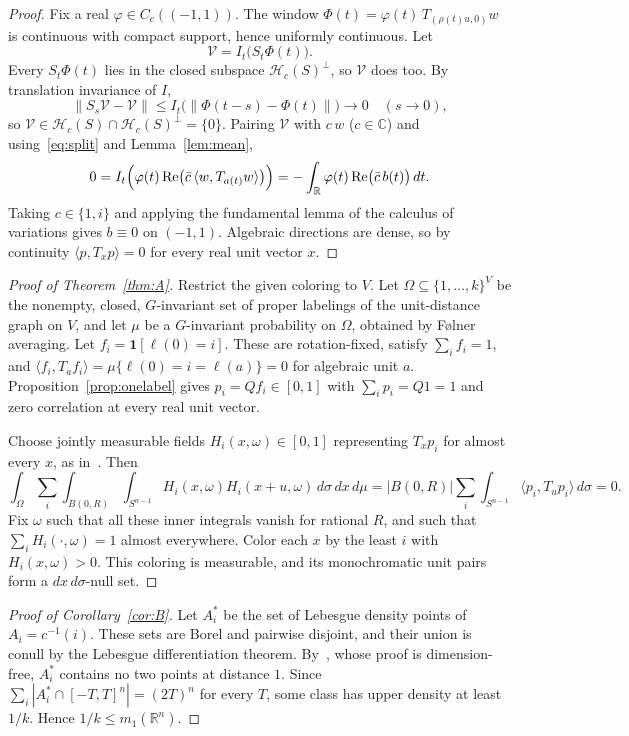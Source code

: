 \documentclass[11pt]{amsart}
\theoremstyle{definition}
\newcommand{\R}{\mathbb{R}}
\newcommand{\C}{\mathbb{C}}
\newcommand{\cH}{\mathcal{H}}
\begin{document}
\begin{proof}
Fix a real $\varphi\in C_c((-1,1))$. The window $\Phi(t)=\varphi(t)\,T_{(\rho(t)u,0)}w$ is continuous with compact support, hence uniformly continuous. Let
\[
\mathcal V=I_t\bigl(S_t\Phi(t)\bigr).
\]
Every $S_t\Phi(t)$ lies in the closed subspace $\cH_c(S)^\perp$, so $\mathcal V$ does too. By translation invariance of $I$,
\[
\|S_s\mathcal V-\mathcal V\|\le I_t\bigl(\|\Phi(t-s)-\Phi(t)\|\bigr)\to0\quad(s\to0),
\]
so $\mathcal V\in\cH_c(S)\cap\cH_c(S)^\perp=\{0\}$. Pairing $\mathcal V$ with $c\,w$ ($c\in\C$) and using~\eqref{eq:split} and Lemma~\ref{lem:mean},
\[
0=I_t\Bigl(\varphi(t)\,\mathrm{Re}\bigl(\bar c\,\langle w,T_{a(t)}w\rangle\bigr)\Bigr)=-\int_\R\varphi(t)\,\mathrm{Re}\bigl(\bar c\,b(t)\bigr)\,dt .
\]
Taking $c\in\{1,i\}$ and applying the fundamental lemma of the calculus of variations gives $b\equiv0$ on $(-1,1)$. Algebraic directions are dense, so by continuity $\langle p,T_xp\rangle=0$ for every real unit vector $x$.
\end{proof}

\begin{proof}[Proof of Theorem~\ref{thm:A}]
Restrict the given coloring to $V$. Let $\Omega\subseteq\{1,\dots,k\}^V$ be the nonempty, closed, $G$-invariant set of proper labelings of the unit-distance graph on $V$, and let $\mu$ be a $G$-invariant probability on $\Omega$, obtained by F\o lner averaging. Let $f_i=\mathbf 1[\ell(0)=i]$. These are rotation-fixed, satisfy $\sum_if_i=1$, and $\langle f_i,T_af_i\rangle=\mu\{\ell(0)=i=\ell(a)\}=0$ for algebraic unit $a$. Proposition~\ref{prop:onelabel} gives $p_i=Qf_i\in[0,1]$ with $\sum_ip_i=Q1=1$ and zero correlation at every real unit vector.

Choose jointly measurable fields $H_i(x,\omega)\in[0,1]$ representing $T_xp_i$ for almost every $x$, as in~\cite[proof of Proposition 4.2]{OAI}. Then
\[
\int_\Omega\sum_i\int_{B(0,R)}\int_{S^{n-1}}H_i(x,\omega)H_i(x+u,\omega)\,d\sigma\,dx\,d\mu=|B(0,R)|\sum_i\int_{S^{n-1}}\langle p_i,T_up_i\rangle\,d\sigma=0 .
\]
Fix $\omega$ such that all these inner integrals vanish for rational $R$, and such that $\sum_iH_i(\cdot,\omega)=1$ almost everywhere. Color each $x$ by the least $i$ with $H_i(x,\omega)>0$. This coloring is measurable, and its monochromatic unit pairs form a $dx\,d\sigma$-null set.
\end{proof}

\begin{proof}[Proof of Corollary~\ref{cor:B}]
Let $A_i^*$ be the set of Lebesgue density points of $A_i=c^{-1}(i)$. These sets are Borel and pairwise disjoint, and their union is conull by the Lebesgue differentiation theorem. By~\cite[Lemma 4.3]{OAI}, whose proof is dimension-free, $A_i^*$ contains no two points at distance $1$. Since $\sum_i|A_i^*\cap[-T,T]^n|=(2T)^n$ for every $T$, some class has upper density at least $1/k$. Hence $1/k\le m_1(\R^n)$.
\end{proof}
\end{document}
